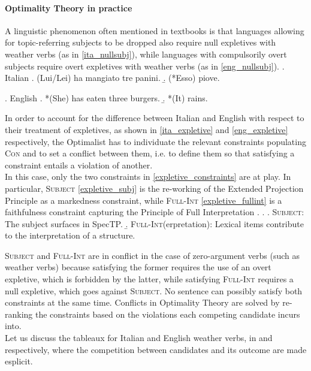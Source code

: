 \paragraph{Optimality Theory in practice} A linguistic phenomenon often mentioned in textbooks is that languages allowing for topic-referring subjects to be dropped also require null expletives with weather verbs (as in \ref{ita_nullsubj}), while languages with compulsorily overt subjects require overt expletives with weather verbs (as in \ref{eng_nullsubj}).
\ex. \label{ita_nullsubj} Italian
\a. (Lui/Lei) ha mangiato tre panini.
\b. \label{ita_expletive} (*Esso) piove.

\ex. \label{eng_nullsubj} English
\a. *(She) has eaten three burgers.
\b. \label{eng_expletive} *(It) rains.

In order to account for the difference between Italian and English with respect to their treatment of expletives, as shown in \ref{ita_expletive} and \ref{eng_expletive} respectively, the Optimalist has to individuate the relevant constraints populating \textsc{Con} and to set a conflict between them, i.e. to define them so that satisfying a constraint entails a violation of another.\\
In this case, only the two constraints in \ref{expletive_constraints} are at play. In particular, \textsc{Subject} \ref{expletive_subj} is the re-working of the Extended Projection Principle \parencite{chomsky1982epp} as a markedness constraint, while \textsc{Full-Int} \ref{expletive_fullint} is a faithfulness constraint capturing the Principle of Full Interpretation \parencite{chomsky1991fullint}.
\ex. \label{expletive_constraints} \a. \label{expletive_subj} \textsc{Subject}: The subject surfaces in SpecTP.
\b. \label{expletive_fullint} \textsc{Full-Int}(erpretation): Lexical items contribute to the interpretation of a structure.

\textsc{Subject} and \textsc{Full-Int} are in conflict in the case of zero-argument verbs (such as weather verbs) because satisfying the former requires the use of an overt expletive, which is forbidden by the latter, while satisfying \textsc{Full-Int} requires a null expletive, which goes against \textsc{Subject}. No sentence can possibly satisfy both constraints at the same time. Conflicts in Optimality Theory are solved by re-ranking the constraints based on the violations each competing candidate incurs into.\\
Let us discuss the tableaux for Italian and English weather verbs, in  and  respectively, where the competition between candidates and its outcome are made esplicit.

